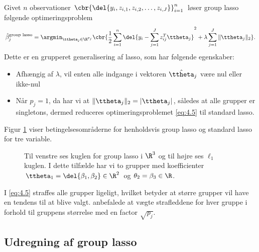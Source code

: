 Givet \(n\) observationer \(\cbr{ \del{y_i, z_{i,1}, z_{i,2}, \ldots, z_{i,J}}}_{i=1}^n\) løser group lasso følgende optimeringsproblem
\begin{align}
\hat{\beta}_j^{\text{group lasso}} = \argmin_{\ttheta_j \in \R^{p_j}} \cbr{\frac{1}{2} \sum_{i=1}^n \del{y_i - \sum_{j=1}^J z_{ij}^T \ttheta_j}^2 + \lambda \sum_{j=1}^J \Vert \ttheta_j \Vert_2}. \label{eq:4.5}
\end{align}
Dette er en grupperet generalisering af lasso, som har følgende egenskaber:
\begin{itemize}
\item Afhængig af $\lambda$, vil enten alle indgange i vektoren $\hat{\ttheta}_j$ være nul eller ikke-nul
\item Når $p_j=1$, da har vi at $\Vert \ttheta_j \Vert_2 = \vert \ttheta_j \vert$, således at alle grupper er singletons, dermed reduceres optimeringsproblemet \eqref{eq:4.5} til standard lasso.
\end{itemize}
Figur \ref{fig:group_lasso} viser betingelsesområderne for henholdsvis group lasso og standard lasso for tre variable.
%
\begin{figure}[H]
\centering
\caption{Til venstre ses kuglen for group lasso i \(\R^3\) og til højre ses \(\ell_1\) kuglen.
I dette tilfælde har vi to grupper med koefficienter \(\ttheta_1 = \del{\beta_1, \beta_2} \in \R^2\) og \(\theta_2 = \beta_3 \in \R\).}
\label{fig:group_lasso}
\end{figure}
%
I \eqref{eq:4.5} straffes alle grupper ligeligt, hvilket betyder at større grupper vil have en tendens til at blive valgt.
\citep{group_lasso} anbefalede at vægte strafleddene for hver gruppe i forhold til gruppens størrelse med en factor \(\sqrt{p_j}\).

\subsection{Udregning af group lasso}

